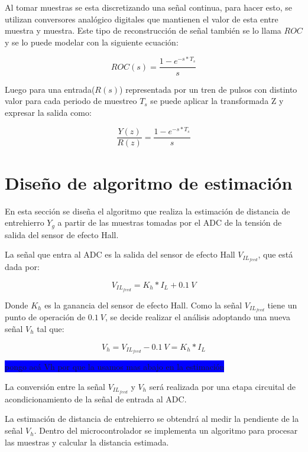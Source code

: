 Al tomar muestras se esta discretizando una señal continua, para hacer esto, se utilizan conversores analógico digitales que mantienen el valor de esta entre muestra y muestra. Este tipo de reconstrucción de señal también se lo llama $ROC$ y se lo puede modelar con la siguiente ecuación:

\begin{equation*}
	ROC(s)=\frac{1-e^{-s*T_s}}{s}
\end{equation*}

Luego para una entrada($R(s)$) representada por un tren de pulsos con distinto valor para cada periodo de muestreo $T_s$ se puede aplicar la transformada Z y expresar la salida como:

\begin{equation*}
	\frac{Y(z)}{R(z)}=\frac{1-e^{-s*T_s}}{s}
\end{equation*}

\section{Diseño de algoritmo de estimación}

En esta sección se diseña el algoritmo que realiza la estimación de distancia de entrehierro $Y_g$ a partir de las muestras tomadas por el ADC de la tensión de salida del sensor de efecto Hall.

La señal que entra al ADC es la salida del sensor de efecto Hall $V_{IL_{feed}}$, que está dada por:

\begin{equation*}
	V_{IL_{feed}}=K_h*I_L+0.1\:V
\end{equation*}

Donde $K_h$ es la ganancia del sensor de efecto Hall. Como la señal $V_{IL_{feed}}$ tiene un punto de operación de $0.1\:V$, se decide realizar el análisis adoptando una nueva señal $V_h$ tal que:

\begin{equation*}
	V_h=V_{IL_{feed}}-0.1\:V=K_h*I_L
\end{equation*}

\colorbox{blue}{pongo acá Vh por que la usamos mas abajo en la estimación}

La conversión entre la señal $V_{IL_{feed}}$ y $V_h$ será realizada por una etapa circuital de acondicionamiento de la señal de entrada al ADC.

La estimación de distancia de entrehierro se obtendrá al medir la pendiente de la señal $V_h$. Dentro del microcontrolador se implementa un algoritmo para procesar las muestras y calcular la distancia estimada. 

